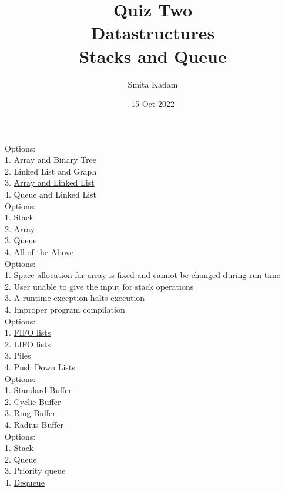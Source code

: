 \documentclass{report}
\title{\Huge{Quiz Two\\Datastructures}\\Stacks and Queue}
\author{\huge{Smita Kadam}}
\date{15-Oct-2022}
\begin{document}
\maketitle
{}
\setlength{\parindent}{0pt}
Options:\\
1. Array and Binary Tree\\
2. Linked List and Graph\\
3. \underline{Array and Linked List}\\
4. Queue and Linked List\\
\setlength{\parindent}{0pt}
Options:\\
1. Stack\\
2. \underline{Array}\\
3. Queue\\
4. All of the Above\\
\setlength{\parindent}{0pt}
Options:\\
1. \underline{Space allocation for array is fixed and cannot be changed during run-time}\\
2. User unable to give the input for stack operations\\
3. A runtime exception halts execution\\
4. Improper program compilation\\
\setlength{\parindent}{0pt}
Options:\\
1. \underline{FIFO lists}\\
2. LIFO lists\\
3. Piles\\
4. Push Down Lists\\

\setlength{\parindent}{0pt}
Options:\\
1. Standard Buffer\\
2. Cyclic Buffer\\
3. \underline{Ring Buffer}\\
4. Radius Buffer\\
\pagebreak
{}
\setlength{\parindent}{0pt}
Options:\\
1. Stack\\
2. Queue\\
3. Priority queue\\
4. \underline{Dequeue}\\
\end{document}

